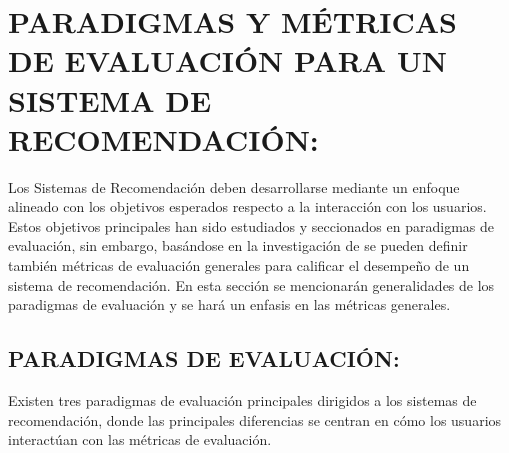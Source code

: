 \section[EVALUACIÓN DE UN SISTEMA DE RECOMENDACIÓN]{PARADIGMAS Y MÉTRICAS DE EVALUACIÓN PARA UN SISTEMA DE RECOMENDACIÓN: }

Los Sistemas de Recomendación deben desarrollarse mediante un enfoque alineado con los objetivos esperados respecto a la interacción con los usuarios. Estos objetivos principales han sido estudiados y seccionados en paradigmas de evaluación, sin embargo, basándose en la investigación de \parencite{Aggarwal2016} se pueden definir también métricas de evaluación generales para calificar el desempeño de un sistema de recomendación. En esta sección se mencionarán generalidades de los paradigmas de evaluación y se hará un enfasis en las métricas generales.

\subsection{PARADIGMAS DE EVALUACIÓN: }

Existen tres paradigmas de evaluación principales dirigidos a los sistemas de recomendación, donde las principales diferencias se centran en cómo los usuarios interactúan con las métricas de evaluación.

